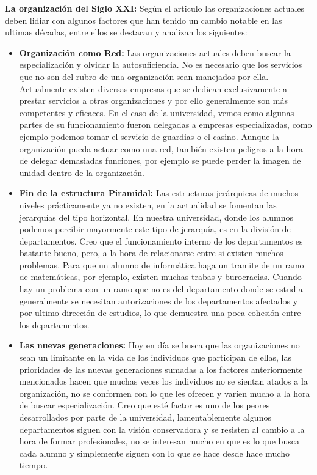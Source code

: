 \documentclass[spanish, fleqn]{article}
\begin{document}
	\textbf{La organización del Siglo XXI:} Según el articulo las organizaciones
	actuales deben lidiar con algunos factores que han tenido un cambio notable
	en las ultimas décadas, entre ellos se destacan y analizan los siguientes:
	\begin{itemize}
		\item
			\textbf{Organización como Red:} Las organizaciones actuales deben
			buscar la especialización y olvidar la autosuficiencia. No es
			necesario que los servicios que no son del rubro de una organización
			sean manejados por ella. Actualmente existen diversas empresas que 
			se dedican exclusivamente a prestar servicios a otras organizaciones 
			y por ello generalmente son más competentes y eficaces. En el caso
			de la universidad, vemos como algunas partes de su funcionamiento 
			fueron delegadas a empresas especializadas, como ejemplo podemos 
			tomar el servicio de guardias o el casino. Aunque la organización
			pueda actuar como una red, también existen peligros a la hora de
			delegar demasiadas funciones, por ejemplo se puede perder la imagen
			de unidad dentro de la organización.
		\item
			\textbf{Fin de la estructura Piramidal:} Las estructuras jerárquicas
			de muchos niveles prácticamente ya no existen, en la actualidad se
			fomentan las jerarquías del tipo horizontal. En nuestra universidad,
			donde los alumnos podemos percibir mayormente este tipo de jerarquía,
			es en la división de departamentos. Creo que el funcionamiento interno
			de los departamentos es bastante bueno, pero, a la hora de relacionarse
			entre si existen muchos problemas. Para que un alumno de informática 
			haga un tramite de un ramo de matemáticas, por ejemplo, existen
			muchas trabas y burocracias. Cuando hay un problema con un ramo que 
			no es del departamento donde se estudia generalmente se necesitan
			autorizaciones de los departamentos afectados y por ultimo dirección
			de estudios, lo que demuestra una poca cohesión entre los departamentos.
		\item
			\textbf{Las nuevas generaciones:} Hoy en día se busca que las
			organizaciones no sean un limitante en la vida de los individuos que
			participan de ellas, las prioridades de las nuevas generaciones 
			sumadas a los factores anteriormente mencionados hacen que muchas
			veces los individuos no se sientan atados a la organización, no se
			conformen con lo que les ofrecen y varíen mucho a la hora de buscar
			especialización. Creo que esté factor es uno de los peores
			desarrollados por parte de la universidad, lamentablemente algunos
			departamentos siguen con la visión conservadora y se resisten al
			cambio a la hora de formar profesionales, no se interesan mucho en
			que es lo que busca cada alumno y simplemente siguen con lo que se
			hace desde hace mucho tiempo.
	\end{itemize}
\end{document}
